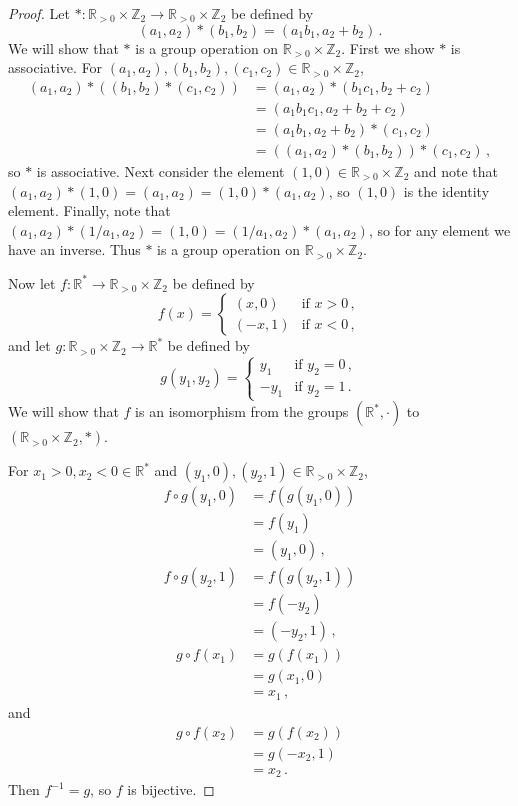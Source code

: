 \documentclass{abrice}
\newcommand{\Z}{\mathbb{Z}}
\newcommand{\R}{\mathbb{R}}
\begin{document}
\begin{proof}
  Let $* : \R_{>0} \times \Z_2 \to \R_{>0} \times \Z_2$ be defined by
  \[
    (a_1, a_2) * (b_1, b_2) = (a_1 b_1, a_2 + b_2)\, .
  \]
  We will show that $*$ is a group operation on $\R_{>0} \times \Z_2$. First we
  show $*$ is associative. For
  $(a_1, a_2), (b_1, b_2), (c_1, c_2) \in \R_{>0} \times \Z_2$,
  \begin{align*}
    (a_1, a_2) * ((b_1, b_2) * (c_1, c_2))
    &= (a_1, a_2) * (b_1 c_1, b_2 + c_2) \\
    &= (a_1 b_1 c_1, a_2 + b_2 + c_2) \\
    &= (a_1 b_1, a_2 + b_2) * (c_1, c_2) \\
    &= ((a_1, a_2) * (b_1, b_2)) * (c_1, c_2)\, ,
  \end{align*}
  so $*$ is associative. Next consider the element $(1,0) \in \R_{>0} \times
  \Z_2$ and note that $(a_1, a_2) * (1, 0) = (a_1, a_2) = (1,0) * (a_1, a_2)$,
  so $(1,0)$ is the identity element. Finally, note that $(a_1, a_2) * (1/a_1,
  a_2) = (1,0) = (1/a_1, a_2) * (a_1, a_2)$, so for any element we have an
  inverse. Thus $*$ is a group operation on $\R_{>0} \times \Z_2$.

  Now let  $f : \R^* \to \R_{>0} \times \Z_2$ be defined by
  \[
    f(x) =
    \begin{cases}
      (x, 0) & \text{if } x > 0\, , \\
      (-x, 1) & \text{if } x < 0\, ,
    \end{cases}
  \]
  and let $g : \R_{>0} \times \Z_2 \to \R^*$ be defined by
  \[
    g(y_1, y_2) =
    \begin{cases}
      y_1 & \text{if } y_2 = 0\, , \\
      -y_1 & \text{if } y_2 = 1\, .
    \end{cases}
  \]
  We will show that $f$ is an isomorphism from the groups $(\R^*, \cdot)$ to
  $(\R_{>0} \times \Z_2, *)$.

  For $x_1 > 0, x_2 < 0 \in \R^*$ and $(y_1, 0), (y_2, 1) \in \R_{>0} \times
  \Z_2$,
  \begin{align*}
    f \circ g (y_1, 0)
    &= f(g(y_1, 0)) \\
    &= f(y_1) \\
    &= (y_1, 0)\, ,
  \end{align*}
  \begin{align*}
    f \circ g(y_2,1)
    &= f(g(y_2, 1)) \\
    &= f(-y_2) \\
    &= (-y_2,1)\, ,
  \end{align*}
  \begin{align*}
    g \circ f(x_1)
    &= g(f(x_1)) \\
    &= g(x_1, 0) \\
    &= x_1\, ,
  \end{align*}
  and
  \begin{align*}
    g \circ f(x_2)
    &= g(f(x_2)) \\
    &= g(-x_2, 1) \\
    &= x_2\, .
  \end{align*}
  Then $f^{-1} = g$, so $f$ is bijective.


\end{proof}
\end{document}
